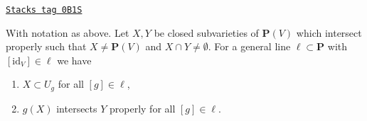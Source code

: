 \begin{lemma}
\label{intersection-lemma-make-family}
\href{https://stacks.math.columbia.edu/tag/0B1S}{\texttt{Stacks tag 0B1S}}

With notation as above. Let $X, Y$ be closed subvarieties of $\mathbf{P}(V)$
which intersect properly such that $X \not = \mathbf{P}(V)$ and
$X \cap Y \not = \emptyset$. For a general line $\ell \subset \mathbf{P}$
with $[\text{id}_V] \in \ell$ we have
\begin{enumerate}
\item $X \subset U_g$ for all $[g] \in \ell$,
\item $g(X)$ intersects $Y$ properly for all $[g] \in \ell$.
\end{enumerate}
\end{lemma}

